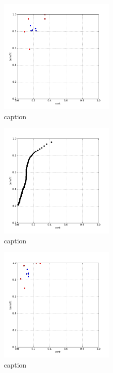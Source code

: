 %
\begin{figure}[!ht]
	\centering
	\includegraphics[width=0.5\textwidth]{img/p1figs/computeFrameStateAnders_sectionCompareBetter_smooth12_tol24.png}
	\caption{caption}
\end{figure}
%
\begin{figure}[!ht]
	\centering
	\includegraphics[width=0.5\textwidth]{img/p1figs/computeFrameStateAnders_sectionCompareBetter_smooth12_tol24_AUC.png}
	\caption{caption}
\end{figure}
%
\begin{figure}[!ht]
	\centering
	\includegraphics[width=0.5\textwidth]{img/p1figs/computeFrameStateAnders_sectionCompareBetter_smooth12_tol48.png}
	\caption{caption}
\end{figure}
